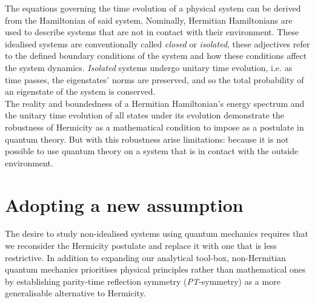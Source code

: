 \documentclass[10pt, a4paper, singlespacing]{report}
\newcommand\PT{\emph{PT}}
\begin{document}
The equations governing the time evolution of a physical system can be derived from the Hamiltonian of said system\cite{BenderPT}. Nominally, Hermitian Hamiltonians are used to describe systems that are not in contact with their environment. These idealised systems are conventionally called \emph{closed} or \emph{isolated}, these adjectives refer to the defined boundary conditions of the system and how these conditions affect the system dynamics. \emph{Isolated} systems undergo unitary time evolution, i.e. as time passes, the eigenstates' norms are preserved, and so the total probability of an eigenstate of the system is conserved. 
\\The reality and boundedness of a Hermitian Hamiltonian's energy spectrum and the unitary time evolution of all states under its evolution demonstrate the robustness of Hermicity as a mathematical condition to impose as a postulate in quantum theory.
But with this robustness arise limitations: because it is not possible to use quantum theory on a system that is in contact with the outside environment.

\section{Adopting a new assumption}\label{Assumptions}
The desire to study non-idealised systems using quantum mechanics requires that we reconsider the Hermicity postulate and replace it with one that is less restrictive.
In addition to expanding our analytical tool-box, non-Hermitian quantum mechanics prioritises physical principles rather than mathematical ones by establishing parity-time reflection symmetry (\PT-symmetry) as a more generalisable alternative to Hermicity.

 
\end{document}

